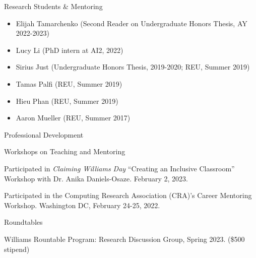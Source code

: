 \documentclass{resume} %
\begin{document}
\begin{rSection}{Research Students \& Mentoring}

\begin{itemize}
\item Elijah Tamarchenko (Second Reader on Undergraduate Honors Thesis, AY 2022-2023)
\item Lucy Li (PhD intern at AI2, 2022)
\item Sirius Just (Undergraduate Honors Thesis, 2019-2020; REU, Summer 2019) 
\item Tamas Palfi (REU, Summer 2019) 
\item Hieu Phan (REU, Summer 2019) 
\item Aaron Mueller (REU, Summer 2017) 
\end{itemize}
\end{rSection}

\begin{rSection}{Professional Development}

\begin{rSubsection}{Workshops on Teaching and Mentoring}{}{}{}
\item Participated in \emph{Claiming Williams Day} ``Creating an Inclusive Classroom'' Workshop with Dr. Anika Daniels-Osaze. February 2, 2023.
\item Participated in the Computing Research Association (CRA)'s Career Mentoring Workshop. Washington DC, February 24-25, 2022.  
\end{rSubsection}


\begin{rSubsection}{Roundtables}{}{}{}
\item Williams Rountable Program: Research Discussion Group, Spring 2023. (\$500 stipend)
\end{rSubsection}
\end{rSection}
\end{document}
